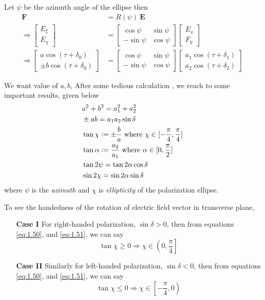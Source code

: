 \documentclass[11pt,a4paper]{article}
\numberwithin{equation}{section}
\begin{document}
Let $\psi$ be the azimuth angle of the ellipse then 
\begin{align}
	\boldsymbol{F}&= R(\psi)\:\boldsymbol{E}\\
	\Rightarrow\begin{bmatrix}E_\xi\\E_\eta\end{bmatrix}&= 
	\begin{bmatrix}
		\cos\psi & \sin\psi \\
		-\sin\psi & \cos\psi
	\end{bmatrix}
	\begin{bmatrix}E_x\\F_y\end{bmatrix}\\
	\Rightarrow
	\begin{bmatrix}
		a \cos(\tau+\delta_0)\\
		\pm b \cos(\tau+\delta_0)
	\end{bmatrix}&=
	\begin{bmatrix}
		\cos\psi & \sin\psi \\
		-\sin\psi & \cos\psi
	\end{bmatrix}
	\begin{bmatrix}
		a_1 \cos(\tau+\delta_1)\\
		a_2 \cos(\tau+\delta_2)
	\end{bmatrix}
\end{align}

We want value of $a, b$, After some tedious calculation \cite{born-wolf}, we reach to some important results, given below 
\begin{align}
	& a^2 + b^2 = a_1^2 + a_2^2\\
	&\pm ab = a_1a_2\sin\delta \label{eq:1.50}\\ 
	&\tan \chi \vcentcolon= \pm\frac{b}{a} \label{eq:1.51}\text{ where } \chi\in[-\frac{\pi}{4},\frac{\pi}{4}]\\
	&\tan \alpha \vcentcolon= \frac{a_2}{a_1} \text{ where } \alpha\in[0,\frac{\pi}{2}]\\
	&\tan 2\psi = \tan 2\alpha \cos\delta\\
	&\sin 2\chi = \sin 2\alpha \sin\delta
\end{align}
where $\psi$ is the \textit{azimuth} and $\chi$ is \textit{ellipticity} of the polarization ellipse. 

To see the handedness of the rotation of electric field vector in transverse plane,
\begin{enumerate}
	\item[\textbf{Case I}] 
	For right-handed polarization, $\sin\delta>0$, then from equations \ref{eq:1.50}, and \ref{eq:1.51}, we can say 
	$$\tan \chi \ge 0\Rightarrow \chi \in \left(0,\frac{\pi}{4}\right]$$
	
	\item[\textbf{Case II}] 
	Similarly for left-handed polarization, $\sin\delta<0$, then from equations \ref{eq:1.50}, and \ref{eq:1.51}, we can say 
	$$\tan \chi \le 0\Rightarrow \chi \in \left[-\frac{\pi}{4},0\right)$$
\end{enumerate}
	
\end{document}
